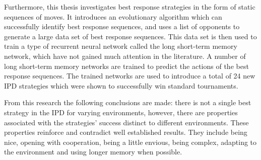 Furthermore, this thesis investigates best response strategies in the form of
static sequences of moves. It introduces an evolutionary algorithm which can
successfully identify best response sequences, and uses a list of
\numberofstrategiesbestsequences opponents to generate a large data set of best
response sequences. This data set is then used to train a type of recurrent
neural network called the long short-term memory network, which have not gained
much attention in the literature. A number of long short-term memory networks
are trained to predict the actions of the best response sequences. The trained
networks are used to introduce a total of 24 new IPD strategies which were shown %
to successfully win standard tournaments.

From this research the following conclusions are made: there is not a single
best strategy in the IPD for varying environments, however, there are properties
associated with the strategies' success distinct to different environments.
These properties reinforce and contradict well established results. They include
being nice, opening with cooperation, being a little envious, being complex,
adapting to the environment and using longer memory when possible.
